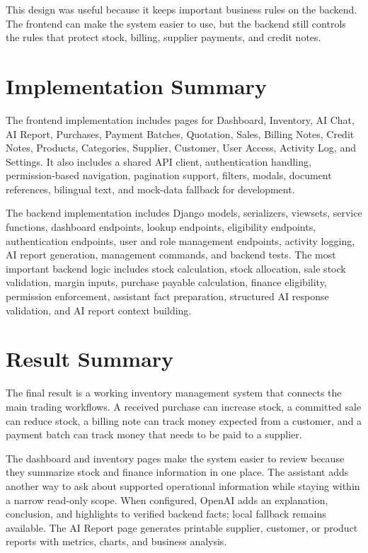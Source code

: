 This design was useful because it keeps important business rules on the backend. The frontend can make the system easier to use, but the backend still controls the rules that protect stock, billing, supplier payments, and credit notes.

\section{Implementation Summary}
The frontend implementation includes pages for Dashboard, Inventory, AI Chat, AI Report, Purchases, Payment Batches, Quotation, Sales, Billing Notes, Credit Notes, Products, Categories, Supplier, Customer, User Access, Activity Log, and Settings. It also includes a shared API client, authentication handling, permission-based navigation, pagination support, filters, modals, document references, bilingual text, and mock-data fallback for development.

The backend implementation includes Django models, serializers, viewsets, service functions, dashboard endpoints, lookup endpoints, eligibility endpoints, authentication endpoints, user and role management endpoints, activity logging, AI report generation, management commands, and backend tests. The most important backend logic includes stock calculation, stock allocation, sale stock validation, margin inputs, purchase payable calculation, finance eligibility, permission enforcement, assistant fact preparation, structured AI response validation, and AI report context building.

\section{Result Summary}
The final result is a working inventory management system that connects the main trading workflows. A received purchase can increase stock, a committed sale can reduce stock, a billing note can track money expected from a customer, and a payment batch can track money that needs to be paid to a supplier.

The dashboard and inventory pages make the system easier to review because they summarize stock and finance information in one place. The assistant adds another way to ask about supported operational information while staying within a narrow read-only scope. When configured, OpenAI adds an explanation, conclusion, and highlights to verified backend facts; local fallback remains available. The AI Report page generates printable supplier, customer, or product reports with metrics, charts, and business analysis.

